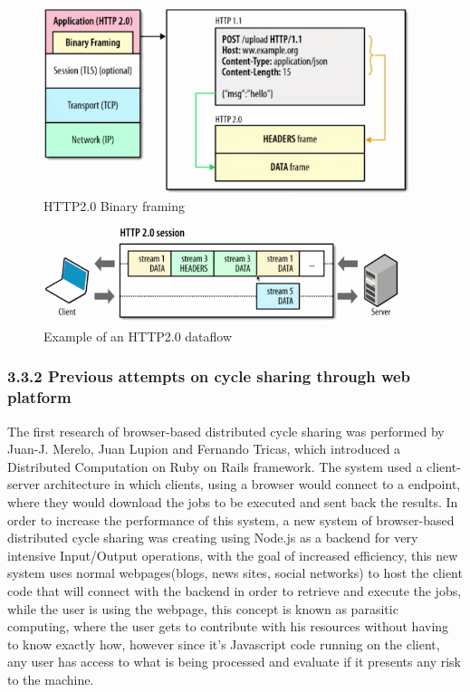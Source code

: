 \begin{figure}[htbp]
  \centering
  \includegraphics[width=0.95\textwidth]{img/http2binaryframing.png}
  \caption{HTTP2.0 Binary framing}
  \label{fig:binaryframing}
\end{figure}

\begin{figure}[htbp]
  \centering
  \includegraphics[width=0.95\textwidth]{img/http2dataflow.png}
  \caption{Example of an HTTP2.0 dataflow}
  \label{fig:http2dataflow}
\end{figure}


\subsubsection{3.3.2 Previous attempts on cycle sharing through web platform}
The first research of browser-based distributed cycle sharing was performed by Juan-J. Merelo, Juan Lupion and Fernando Tricas, which introduced a Distributed Computation on Ruby on Rails framework\cite{Merelo2007}. The system used a client-server architecture in which clients, using a browser would connect to a endpoint, where they would download the jobs to be executed and sent back the results. In order to increase the performance of this system, a new system\cite{Duda2013} of browser-based distributed cycle sharing was creating using Node.js as a backend for very intensive Input/Output operations\cite{Tilkov2010}, with the goal of increased efficiency, this new system uses normal webpages(blogs, news sites, social networks) to host the client code that will connect with the backend in order to retrieve and execute the jobs, while the user is using the webpage, this concept is known as parasitic computing\cite{Barabasi2001}, where the user gets to contribute with his resources without having to know exactly how, however since it's Javascript code running on the client, any user has access to what is being processed and evaluate if it presents any risk to the machine.

